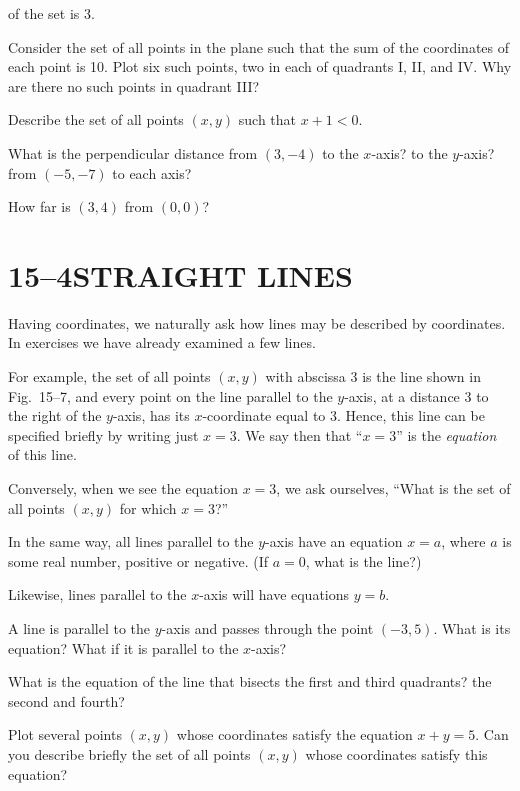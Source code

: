 \documentclass[11pt]{book}
\theoremstyle{bkplain}
\begin{document}
\begin{exercisecols}
\begin{exlist}
  of the set is 3.
\item Consider the set of all points in the plane such that the sum of the
  coordinates of each point is 10. Plot six such points, two in each of
  quadrants I, II, and IV. Why are there no such points in quadrant III?
\item Describe the set of all points $(x, y)$ such that $x + 1 < 0$.
\item What is the perpendicular distance from $(3, -4)$ to the $x$-axis? to
  the $y$-axis? from $(-5, -7)$ to each axis?
\item How far is $(3, 4)$ from $(0, 0)$?
\end{exlist}
\end{exercisecols}

\section*{15--4\quad STRAIGHT LINES}

Having coordinates, we naturally ask how lines may be described by
coordinates. In exercises we have already examined a few lines.

For example, the set of all points $(x, y)$ with abscissa 3 is the line shown
in Fig.~15--7, and every point on the line parallel to the $y$-axis, at a
distance 3 to the right of the $y$-axis, has its $x$-coordinate equal to 3.
Hence, this line can be specified briefly by writing just $x = 3$. We say then
that ``$x = 3$'' is the \emph{equation} of this line.

\FIGXVSEVEN

Conversely, when we see the equation $x = 3$, we ask ourselves, ``What is the
set of all points $(x, y)$ for which $x = 3$?''

In the same way, all lines parallel to the $y$-axis have an equation $x = a$,
where $a$ is some real number, positive or negative. (If $a = 0$, what is the
line?)

Likewise, lines parallel to the $x$-axis will have equations $y = b$.

\begin{exercisecols}
\begin{exlist}
\item A line is parallel to the $y$-axis and passes through the point
  $(-3, 5)$. What is its equation? What if it is parallel to the $x$-axis?
\item What is the equation of the line that bisects the first and third
  quadrants? the second and fourth?
\item[\stex 3.] Plot several points $(x, y)$ whose coordinates satisfy the
  equation $x + y = 5$. Can you describe briefly the set of all points
  $(x, y)$ whose coordinates satisfy this equation?
\end{exlist}
\end{exercisecols}
\end{document}

